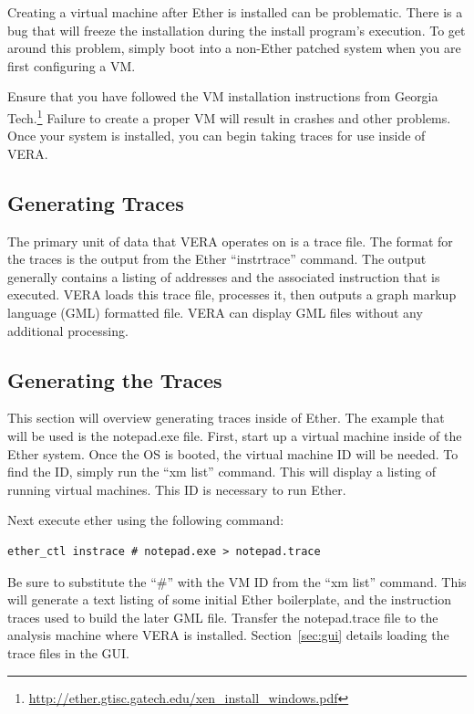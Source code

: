 \documentclass[11pt]{article}
\begin{document}
Creating a virtual machine after Ether is installed can be
problematic. There is a bug that will freeze the installation during
the install program's execution. To get around this problem, simply
boot into a non-Ether patched system when you are first configuring a
VM.

Ensure that you have followed the VM installation instructions from
Georgia Tech.\footnote{\url{http://ether.gtisc.gatech.edu/xen_install_windows.pdf}}
Failure to create a proper VM will result in crashes and other
problems. Once your system is installed, you can begin taking traces for use
inside of VERA. 

\subsection{Generating Traces}

The primary unit of data that VERA operates on is a trace file. The
format for the traces is the output from the Ether
``instrtrace'' command. The output generally
contains a listing of addresses and the associated instruction that is
executed. VERA loads this trace file, processes it, then outputs a
graph markup language (GML) formatted file. VERA can display GML files
without any additional processing.

\subsection{Generating the Traces}
This section will overview generating traces inside of Ether. The
example that will be used is the notepad.exe file. First, start up a
virtual machine inside of the Ether system. Once the OS is booted,
the virtual machine ID will be needed. To find the ID, simply run the
``xm list'' command. This will display a listing of running virtual
machines. This ID is necessary to run Ether.

Next execute ether using the following command:

\begin{verbatim}ether_ctl instrace # notepad.exe > notepad.trace\end{verbatim}

Be sure to substitute the ``\#'' with the VM ID from the ``xm list''
command. This will generate a text listing of some initial Ether boilerplate,
and the instruction traces used to build the later GML file. Transfer
the notepad.trace file to the analysis machine where VERA is
installed. Section~\ref{sec:gui} details loading the trace files in
the GUI.
\end{document}

